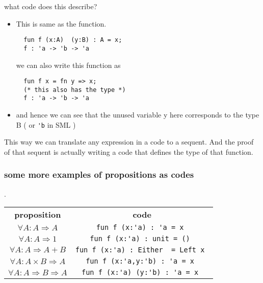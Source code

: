 \documentclass{article}
\begin{document}
what code does this describe?
\begin{itemize}

\item This is same as the function.
\begin{verbatim}
  fun f (x:A)  (y:B) : A = x;
  f : 'a -> 'b -> 'a
\end{verbatim}
  we can also write this function as
\begin{verbatim}
  fun f x = fn y => x;
  (* this also has the type *)
  f : 'a -> 'b -> 'a
\end{verbatim}
  \item and hence we can see that the unused variable y here corresponds to the type B ( or \verb|'b| in SML )
\end{itemize}




This way we can translate any expression in a code to a sequent. And the proof of that sequent is actually writing a code that
defines the type of that function.\\

\subsubsection{some more examples of propositions as codes}.

\begin{tabular}{c c}
  \textbf{proposition} & \textbf{code} \\
  $ \forall A: A \Rightarrow A $ & \verb|fun f (x:'a) : 'a = x |\\
  $ \forall A: A \Rightarrow 1 $ & \verb|fun f (x:'a) : unit = () |\\
  $ \forall A: A \Rightarrow A+B $ & \verb|fun f (x:'a) : Either  = Left x |\\
  $ \forall A: A \times B \Rightarrow A $ & \verb|fun f (x:'a,y:'b) : 'a = x |\\
  $ \forall A: A \Rightarrow B \Rightarrow A $ & \verb|fun f (x:'a) (y:'b) : 'a = x |\\
  
\end{tabular}
\end{document}
